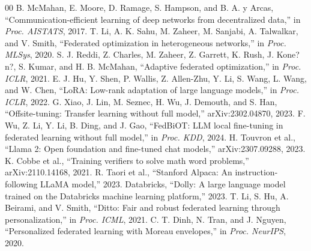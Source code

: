 \documentclass[conference]{IEEEtran}
\begin{document}
\balance
\begin{thebibliography}{00}
 B. McMahan, E. Moore, D. Ramage, S. Hampson, and B. A. y Arcas, ``Communication-efficient learning of deep networks from decentralized data,'' in \emph{Proc. AISTATS}, 2017.
 T. Li, A. K. Sahu, M. Zaheer, M. Sanjabi, A. Talwalkar, and V. Smith, ``Federated optimization in heterogeneous networks,'' in \emph{Proc. MLSys}, 2020.
 S. J. Reddi, Z. Charles, M. Zaheer, Z. Garrett, K. Rush, J. Kone?n?, S. Kumar, and H. B. McMahan, ``Adaptive federated optimization,'' in \emph{Proc. ICLR}, 2021.
 E. J. Hu, Y. Shen, P. Wallis, Z. Allen-Zhu, Y. Li, S. Wang, L. Wang, and W. Chen, ``LoRA: Low-rank adaptation of large language models,'' in \emph{Proc. ICLR}, 2022.
 G. Xiao, J. Lin, M. Seznec, H. Wu, J. Demouth, and S. Han, ``Offsite-tuning: Transfer learning without full model,'' arXiv:2302.04870, 2023.
 F. Wu, Z. Li, Y. Li, B. Ding, and J. Gao, ``FedBiOT: LLM local fine-tuning in federated learning without full model,'' in \emph{Proc. KDD}, 2024.
 H. Touvron et al., ``Llama 2: Open foundation and fine-tuned chat models,'' arXiv:2307.09288, 2023.
 K. Cobbe et al., ``Training verifiers to solve math word problems,'' arXiv:2110.14168, 2021.
 R. Taori et al., ``Stanford Alpaca: An instruction-following LLaMA model,'' 2023.
 Databricks, ``Dolly: A large language model trained on the Databricks machine learning platform,'' 2023.
 T. Li, S. Hu, A. Beirami, and V. Smith, ``Ditto: Fair and robust federated learning through personalization,'' in \emph{Proc. ICML}, 2021.
 C. T. Dinh, N. Tran, and J. Nguyen, ``Personalized federated learning with Moreau envelopes,'' in \emph{Proc. NeurIPS}, 2020.
\end{thebibliography}
\end{document}
